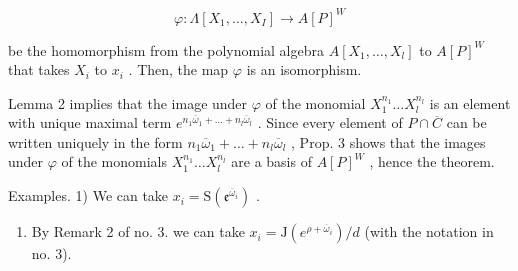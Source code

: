 \[
\varphi : \Lambda [ X _ {1}, \dots , X _ {I} ] \rightarrow A [ P ] ^ {W}
\]

be the homomorphism from the polynomial algebra \(A[X_{1},\ldots,X_{l}]\) to \(A[P]^{W}\) that takes \(X_{i}\) to \(x_{i}\) . Then, the map \(\varphi\) is an isomorphism.

Lemma 2 implies that the image under \(\varphi\) of the monomial \(X_{1}^{n_{1}}\ldots X_{l}^{n_{l}}\) is an element with unique maximal term \(e^{n_1\overline{\omega}_1 + \dots +n_l\overline{\omega}_l}\) . Since every element of \(P\cap \overline{C}\) can be written uniquely in the form \(n_1\overline{\omega}_1 + \dots +n_l\overline{\omega}_l\) , Prop. 3 shows that the images under \(\varphi\) of the monomials \(X_{1}^{n_{1}}\ldots X_{l}^{n_{l}}\) are a basis of \(A[P]^W\) , hence the theorem.

Examples. 1) We can take \(x_{i} = \mathrm{S}(\mathfrak{e}^{\overline{\omega}_i})\) .

\begin{enumerate}
\def\labelenumi{\arabic{enumi})}
\setcounter{enumi}{1}
\tightlist
\item
  By Remark 2 of no. 3. we can take \(x_{i} = \mathrm{J}(e^{\rho +\overline{\omega}_i}) / d\) (with the notation in no. 3).
\end{enumerate}

